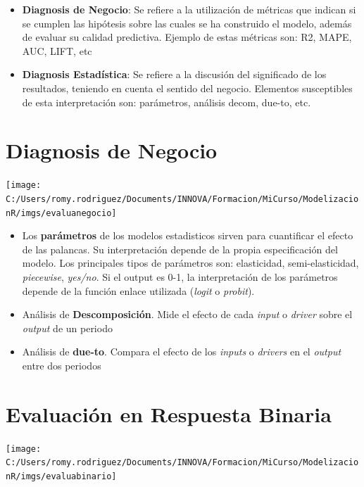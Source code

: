 \documentclass[]{book}
\begin{document}
\begin{itemize}
\item
  \textbf{Diagnosis de Negocio}: Se refiere a la utilización de métricas que indican si se cumplen las hipótesis sobre las cuales se ha construido el modelo, además de evaluar su calidad predictiva. Ejemplo de estas métricas son: R2, MAPE, AUC, LIFT, etc
\item
  \textbf{Diagnosis Estadística}: Se refiere a la discusión del significado de los resultados, teniendo en cuenta el sentido del negocio. Elementos susceptibles de esta interpretación son: parámetros, análisis decom, due-to, etc.
\end{itemize}

\hypertarget{diagnosis-de-negocio}{%
\section{Diagnosis de Negocio}\label{diagnosis-de-negocio}}

\texttt{[image: C:/Users/romy.rodriguez/Documents/INNOVA/Formacion/MiCurso/ModelizacionR/imgs/evaluanegocio]}

\begin{itemize}
\item
  Los \textbf{parámetros} de los modelos estadisticos sirven para cuantificar el efecto de las palancas. Su interpretación depende de la propia especificación del modelo. Los principales tipos de parámetros son: elasticidad, semi-elasticidad, \emph{piecewise}, \emph{yes/no}. Si el output es 0-1, la interpretación de los parámetros depende de la función enlace utilizada (\emph{logit} o \emph{probit}).
\item
  Análisis de \textbf{Descomposición}. Mide el efecto de cada \emph{input} o \emph{driver} sobre el \emph{output} de un periodo
\item
  Análisis de \textbf{due-to}. Compara el efecto de los \emph{inputs} o \emph{drivers} en el \emph{output} entre dos periodos
\end{itemize}

\hypertarget{evaluacion-en-respuesta-binaria}{%
\section{Evaluación en Respuesta Binaria}\label{evaluacion-en-respuesta-binaria}}

\texttt{[image: C:/Users/romy.rodriguez/Documents/INNOVA/Formacion/MiCurso/ModelizacionR/imgs/evaluabinario]}
\end{document}
